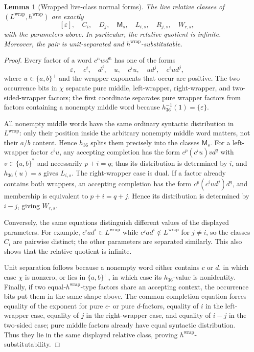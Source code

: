 \documentclass[11pt,a4paper]{article}
\newtheorem{lemma}[theorem]{Lemma}
\newcommand{\eps}{\varepsilon}
\begin{document}
\begin{lemma}[Wrapped live-class normal forms]
\label{lem:wrapped-normal-forms}
The live relative classes of
$(L^{\mathrm{wrap}},h^{\mathrm{wrap}})$ are exactly
\[
  [\eps],\quad C_i,\quad D_j,\quad \mathsf{M}_s,
  \quad L_{i,s},\quad R_{j,s},\quad W_{r,s},
\]
with the parameters above.  In particular, the relative quotient is infinite.
Moreover, the pair is unit-separated and $h^{\mathrm{wrap}}$-substitutable.
\end{lemma}

\begin{proof}
Every factor of a word $c^nwd^n$ has one of the forms
\[
  \eps,\quad c^i,\quad d^j,\quad
  u,\quad c^iu,\quad ud^j,\quad c^iud^j,
\]
where $u\in\{a,b\}^+$ and the wrapper exponents that occur are positive.
The two occurrence bits in $\chi$ separate pure middle, left-wrapper,
right-wrapper, and two-sided-wrapper factors; the first coordinate separates
pure wrapper factors from factors containing a nonempty middle word because
$h_{36}^{-1}(1)=\{\eps\}$.

All nonempty middle words have the same ordinary syntactic distribution in
$L^{\mathrm{wrap}}$: only their position inside the arbitrary nonempty middle
word matters, not their $a/b$ content.  Hence $h_{36}$ splits them precisely
into the classes $\mathsf M_s$.
For a left-wrapper factor $c^iu$, any accepting completion has the form
$c^p(c^iu)v d^q$ with $v\in\{a,b\}^*$ and necessarily $p+i=q$;
thus its distribution is determined by $i$, and $h_{36}(u)=s$ gives
$L_{i,s}$.  The right-wrapper case is dual.  If a factor already contains
both wrappers, an accepting completion has the form
$c^p(c^iud^j)d^q$, and membership is equivalent to
$p+i=q+j$.  Hence its distribution is determined by $i-j$, giving
$W_{r,s}$.

Conversely, the same equations distinguish different values of the displayed
parameters.  For example, $c^iad^i\in L^{\mathrm{wrap}}$ while
$c^jad^i\notin L^{\mathrm{wrap}}$ for $j\ne i$, so the classes $C_i$ are
pairwise distinct; the other parameters are separated similarly.  This also
shows that the relative quotient is infinite.

Unit separation follows because a nonempty word either contains $c$ or $d$,
in which case $\chi$ is nonzero, or lies in $\{a,b\}^+$, in which case its
$h_{36}$-value is nonidentity.  Finally, if two equal-$h^{\mathrm{wrap}}$-type
factors share an accepting context, the occurrence bits put them in the same
shape above.  The common completion equation forces equality of the exponent for pure
$c$- or pure $d$-factors, equality of $i$ in the left-wrapper case, equality
of $j$ in the right-wrapper case, and equality of $i-j$ in the two-sided
case; pure middle factors already have equal syntactic distribution.  Thus
they lie in the same displayed relative class, proving
$h^{\mathrm{wrap}}$-substitutability.
\end{proof}
\end{document}
